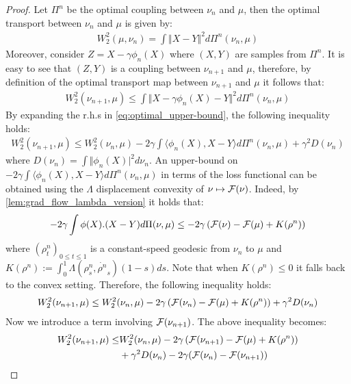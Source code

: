 \begin{proof}
	Let $\Pi^n$ be the optimal coupling between $\nu_n$ and $\mu$, then the optimal transport between $\nu_n$ and $\mu$ is given by:
	\begin{align}
	W_2^2(\mu,\nu_n)=\int \Vert X-Y \Vert^2 d\Pi^n(\nu_n,\mu)
	\end{align}
	Moreover, consider $Z=X-\gamma \phi_n(X)$ where $(X,Y)$ are samples from $\Pi^n$. It is easy to see that $(Z,Y)$ is a coupling between $\nu_{n+1}$ and $\mu$, therefore, by definition of the optimal transport map between $\nu_{n+1}$ and $\mu$ it follows that:
	\begin{align}\label{eq:optimal_upper-bound}
	W_2^2(\nu_{n+1},\mu)\leq \int \Vert X-\gamma \phi_{n}(X)-Y\Vert^2 d\Pi^n(\nu_n,\mu)
	\end{align}
	By expanding the r.h.s in \cref{eq:optimal_upper-bound}, the following inequality holds:
	\begin{align}\label{eq:main_inequality}
	W_2^2(\nu_{n+1},\mu)\leq W_2^2(\nu_{n},\mu) -2\gamma \int \langle \phi_n(X), X-Y \rangle d\Pi^n(\nu_n,\mu)+ \gamma^2D(\nu_n)
	\end{align}
	where $D(\nu_n) = \int \Vert \phi_n(X)\vert^2 d\nu_n $.
	An upper-bound on $-2\gamma \int \langle \phi_n(X), X-Y \rangle d\Pi^n(\nu_n,\mu) $ in terms of the loss functional can be obtained using the $\Lambda$ displacement convexity of $\nu\mapsto {{\mathcal F}}(\nu)$. Indeed, by \cref{lem:grad_flow_lambda_version} it holds that:
	\begin{align}\label{eq:flow_upper-bound}
	-2\gamma \int  \phi(X).(X-Y) d\Pi(\nu,\mu)
	\leq
	-2\gamma\left({{\mathcal F}}(\nu)- {{\mathcal F}}(\mu) +K(\rho^n)\right)
	\end{align}
	where $(\rho^n_t)_{0\leq t \leq 1}$ is a constant-speed geodesic from $\nu_n$ to $\mu$ and $K(\rho^n):=\int_0^1 \Lambda(\rho^n_s,\dot{\rho^n}_s)(1-s)ds$. Note that when $K(\rho^n)\leq 0$ it falls back to the convex setting.
	Therefore, the following inequality holds:
	\begin{align}
	W_2^2(\nu_{n+1},\mu)\leq W_2^2(\nu_{n},\mu) - 2\gamma\left({{\mathcal F}}(\nu_n)- {{\mathcal F}}(\mu) +K(\rho^n)\right) +\gamma^2 D(\nu_n)
	\end{align}
	Now we introduce a term involving ${{\mathcal F}}(\nu_{n+1})$. The above inequality becomes:
	\begin{align}
	W_2^2(\nu_{n+1},\mu)\leq & W_2^2(\nu_{n},\mu) - 2\gamma\left(\F(\nu_{n+1})- \F(\mu) +K(\rho^n)\right) \\
	&+\gamma^2 D(\nu_n) -2\gamma (\F(\nu_n)-\F(\nu_{n+1}))

\end{align}
\end{proof}
